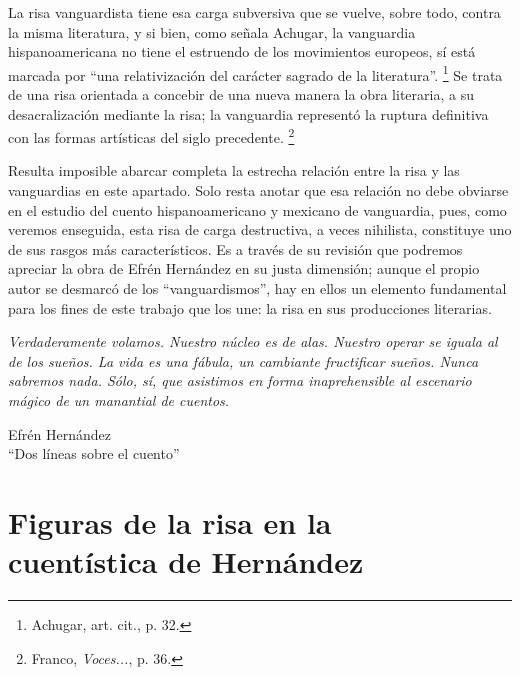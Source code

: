 \documentclass[14pt,twoside,final]{extbook} %
\let\oldfootnote\footnote
\renewcommand\footnote[1]{%
\oldfootnote{\hspace{1mm}#1}}
\begin{document}
La risa vanguardista tiene esa carga subversiva que se vuelve, sobre todo, contra la misma literatura, y si bien, como señala Achugar, la vanguardia hispanoamericana no tiene el estruendo de los movimientos europeos, sí está marcada por ``una relativización del carácter sagrado de la literatura''.\footnote{Achugar, art. cit., p. 32.} Se trata de una risa orientada a concebir de una nueva manera la obra literaria, a su desacralización mediante la risa; la vanguardia representó la ruptura definitiva con las formas artísticas del siglo precedente.\footnote{Franco, \emph{Voces...}, p. 36.}

Resulta imposible abarcar completa la estrecha relación entre la risa y las vanguardias en este apartado. Solo resta anotar que esa relación no debe obviarse en el estudio del cuento hispanoamericano y mexicano de vanguardia, pues, como veremos enseguida, esta risa de carga destructiva, a veces nihilista, constituye uno de sus rasgos más característicos. Es a través de su revisión que podremos apreciar la obra de Efrén Hernández en su justa dimensión; aunque el propio autor se desmarcó de los ``vanguardismos'', hay en ellos un elemento fundamental para los fines de este trabajo que los une: la risa en sus producciones literarias.
\cleardoublepage
\newpage
\pagestyle{empty}
\vspace*{42pt}
\begin{flushright}
\begin{minipage}{7.5cm} %
\emph{Verdaderamente volamos. Nuestro núcleo es de alas. Nuestro operar se iguala al de los sueños. La vida es una fábula, un cambiante fructificar sueños. Nunca sabremos nada. Sólo, sí, que asistimos en forma inaprehensible al escenario mágico de un manantial de cuentos.}
\begin{flushright}
Efrén Hernández \\ ``Dos líneas sobre el cuento''
\end{flushright}
\end{minipage}
\end{flushright}
\chapter[\textsc{Figuras de la risa en la cuentística de Hernández}]{Figuras de la risa en la \\ cuentística de Hernández}\label{ch:figuras-de-la-risa-en-la-cuentistica-de-hernandez}
\BgThispage
\thispagestyle{empty}
\pagestyle{fancy}
\fancyhf{} %
\fancyhead[RO,LE]{\thepage}
\renewcommand{\headrulewidth}{0pt}
\setcounter{page}{45}
\end{document}

